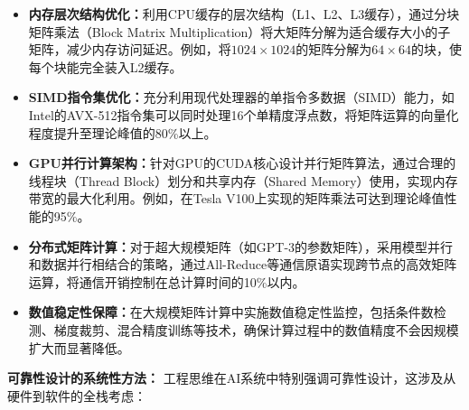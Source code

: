\begin{itemize}
\item \textbf{内存层次结构优化：}利用CPU缓存的层次结构（L1、L2、L3缓存），通过分块矩阵乘法（Block Matrix Multiplication）将大矩阵分解为适合缓存大小的子矩阵，减少内存访问延迟。例如，将$1024 \times 1024$的矩阵分解为$64 \times 64$的块，使每个块能完全装入L2缓存。

\item \textbf{SIMD指令集优化：}充分利用现代处理器的单指令多数据（SIMD）能力，如Intel的AVX-512指令集可以同时处理16个单精度浮点数，将矩阵运算的向量化程度提升至理论峰值的80\%以上。

\item \textbf{GPU并行计算架构：}针对GPU的CUDA核心设计并行矩阵算法，通过合理的线程块（Thread Block）划分和共享内存（Shared Memory）使用，实现内存带宽的最大化利用。例如，在Tesla V100上实现的矩阵乘法可达到理论峰值性能的95\%。

\item \textbf{分布式矩阵计算：}对于超大规模矩阵（如GPT-3的参数矩阵），采用模型并行和数据并行相结合的策略，通过All-Reduce等通信原语实现跨节点的高效矩阵运算，将通信开销控制在总计算时间的10\%以内。

\item \textbf{数值稳定性保障：}在大规模矩阵计算中实施数值稳定性监控，包括条件数检测、梯度裁剪、混合精度训练等技术，确保计算过程中的数值精度不会因规模扩大而显著降低。
\end{itemize}

\textbf{可靠性设计的系统性方法：}
工程思维在AI系统中特别强调可靠性设计，这涉及从硬件到软件的全栈考虑：

